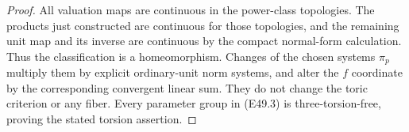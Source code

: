 \begin{proof}
All valuation maps are
continuous in the
power-class topologies.
The products just
constructed are
continuous for those
topologies, and the
remaining unit map
and its inverse are
continuous by the
compact normal-form
calculation. Thus the
classification is a
homeomorphism. Changes
of the chosen systems
$\pi_p$ multiply them
by explicit ordinary-unit
norm systems, and alter
the $f$ coordinate by
the corresponding
convergent linear sum.
They do not change
the toric criterion
or any fiber.
Every parameter group
in (E49.3) is
three-torsion-free,
proving the stated
torsion assertion.
\end{proof}
